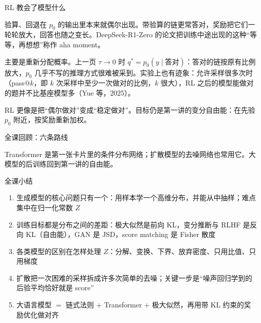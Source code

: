 \documentclass[aspectratio=169,10pt,UTF8,fontset=none]{ctexbeamer}
\begin{document}
\begin{frame}{RL 教会了模型什么}
  \begin{answer}[回到问题 1]
    验算、回退在 $p_0$ 的输出里本来就偶尔出现。带验算的链更常答对，奖励把它们一轮轮放大，回答也随之变长。DeepSeek-R1-Zero 的论文把训练中途出现的这种“等等，再想想”称作 aha moment。
  \end{answer}
  \vspace{2mm}
  \begin{answer}[回到问题 2]
    主要是重新分配概率。上一页 $\tau\to0$ 时 $q^*=p_0(y\mid\text{答对})$：答对的链按原有比例放大，$p_0$ 几乎不写的推理方式很难被采到。实验上也有迹象：允许采样很多次时（pass@$k$，即 $k$ 次采样中至少一次做对的比例，$k$ 很大），RL 之后的模型能做对的题并不比基座模型多（Yue 等，2025）。
  \end{answer}
  \vfill
  \begin{takeaway}
    RL 更像是把“偶尔做对”变成“稳定做对”。目标仍是第一讲的变分自由能：在先验 $p_0$ 附近，按奖励重新加权。
  \end{takeaway}
\end{frame}

\begin{frame}{全课回顾：六条路线}
  \centering
  
  \vfill
  {\small Transformer 是第一张卡片里的条件分布网络；扩散模型的去噪网络也常用它。大模型的后训练回到第一讲的自由能。}
\end{frame}

\begin{frame}{全课小结}
  \begin{takeaway}[带走的几件事]
    \begin{enumerate}
      \item 生成模型的核心问题只有一个：用样本学一个高维分布，并能从中抽样；难点集中在归一化常数 $Z$
      \item 训练目标都是分布之间的差距：极大似然是前向 KL，变分推断与 RLHF 是反向 KL（自由能），GAN 是 JSD，score matching 是 Fisher 散度
      \item 各类模型的区别在怎样处理 $Z$：分解、变换、下界、放弃密度、只用比值、只用梯度
      \item 扩散把一次困难的采样拆成许多次简单的去噪；关键一步是“噪声回归学到的后验平均恰好就是 score”
      \item 大语言模型 $=$ 链式法则 $+$ Transformer $+$ 极大似然，再用带 KL 约束的奖励优化做对齐
    \end{enumerate}
  \end{takeaway}
\end{frame}
\end{document}
